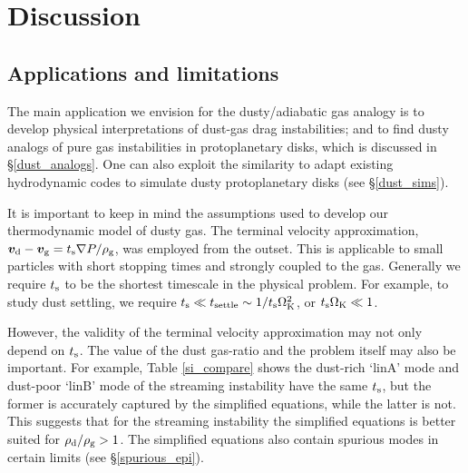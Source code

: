 \section{Discussion}\label{discussion}


{


\subsection{Applications and limitations}

The main application we envision for the dusty/adiabatic gas analogy 
is to develop physical interpretations of dust-gas drag instabilities; and to find 
dusty analogs of pure gas instabilities in protoplanetary disks, 
which is discussed in \S\ref{dust_analogs}. One can also exploit the similarity to adapt existing
hydrodynamic codes to simulate dusty protoplanetary disks (see \S\ref{dust_sims}). 

It is important to keep in mind the assumptions 
used to develop our thermodynamic model of dusty gas. 
The terminal velocity approximation, $\bm{v}_\mathrm{d} -
\bm{v}_\mathrm{g} = t_\mathrm{s} \nabla P /\rho_\mathrm{g}$, was employed from the
outset. 
This is applicable to small particles with short stopping times and
strongly coupled to the gas. Generally we require $t_\mathrm{s}$ to be the
shortest timescale in the physical problem. For  
example, to study dust settling, we require $t_\mathrm{s} \ll
t_\mathrm{settle}\sim 1/t_\mathrm{s}\Omega_{\rm K}^2$, or 
$t_\mathrm{s}\Omega_{\rm K} \ll 1$. 


However, the validity of the terminal velocity approximation may not
only depend on $t_\mathrm{s}$. The value of the dust gas-ratio and the
problem itself may also be important. 
For example, Table \ref{si_compare} shows the dust-rich
`linA' mode and dust-poor `linB' mode of the streaming instability
have the same $t_\mathrm{s}$, but the former is accurately captured by the
simplified equations, while the latter is not.  This suggests that for
the streaming instability the simplified equations is better suited
for $\rho_\mathrm{d}/\rho_\mathrm{g}>1$. The simplified equations also contain spurious
modes in certain limits (see \S\ref{spurious_epi}). 

}
